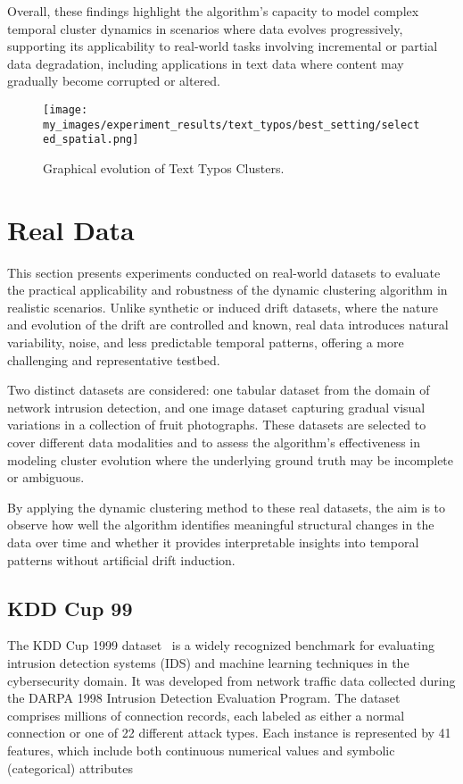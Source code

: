 Overall, these findings highlight the algorithm's capacity to model complex
temporal cluster dynamics in scenarios where data evolves progressively,
supporting its applicability to real-world tasks involving incremental or
partial data degradation, including applications in text data where content may
gradually become corrupted or altered.

\begin{figure}[H]
      \centering
      \texttt{[image: my\_images/experiment\_results/text\_typos/best\_setting/selected\_spatial.png]}
      \caption{Graphical evolution of Text Typos Clusters.}
\end{figure}



\section{Real Data}\label{sec:real_data}

This section presents experiments conducted on real-world datasets to evaluate
the practical applicability and robustness of the dynamic clustering algorithm
in realistic scenarios. Unlike synthetic or induced drift datasets, where the
nature and evolution of the drift are controlled and known, real data
introduces natural variability, noise, and less predictable temporal patterns,
offering a more challenging and representative testbed.

Two distinct datasets are considered: one tabular dataset from the domain of
network intrusion detection, and one image dataset capturing gradual visual
variations in a collection of fruit photographs. These datasets are selected to
cover different data modalities and to assess the algorithm's effectiveness in
modeling cluster evolution where the underlying ground truth may be incomplete
or ambiguous.

By applying the dynamic clustering method to these real datasets, the aim is to
observe how well the algorithm identifies meaningful structural changes in the
data over time and whether it provides interpretable insights into temporal
patterns without artificial drift induction.

\subsection{KDD Cup 99}\label{subsec:kdd_data}
The KDD Cup 1999 dataset~\cite{kdd99dataset} is a widely recognized benchmark
for evaluating intrusion detection systems (IDS) and machine learning
techniques in the cybersecurity domain. It was developed from network traffic
data collected during the DARPA 1998 Intrusion Detection Evaluation Program.
The dataset comprises millions of connection records, each labeled as either a
normal connection or one of 22 different attack types. Each instance is
represented by 41 features, which include both continuous numerical values and
symbolic (categorical) attributes

